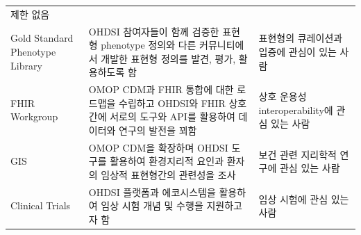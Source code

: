 \documentclass[10.5pt]{book}
\theoremstyle{definition}
\theoremstyle{definition}
\theoremstyle{definition}
\theoremstyle{remark}
\begin{document}
\begin{longtable}[]{@{}lll@{}}
\begin{minipage}[t]{0.37\columnwidth}
제한 없음\strut
\end{minipage}\tabularnewline
\begin{minipage}[t]{0.11\columnwidth}\raggedright\strut
Gold Standard Phenotype Library\strut
\end{minipage} & \begin{minipage}[t]{0.44\columnwidth}\raggedright\strut
OHDSI 참여자들이 함께 검증한 표현형 phenotype 정의와 다른 커뮤니티에서
개발한 표현형 정의를 발견, 평가, 활용하도록 함\strut
\end{minipage} & \begin{minipage}[t]{0.37\columnwidth}\raggedright\strut
표현형의 큐레이션과 입증에 관심이 있는 사람\strut
\end{minipage}\tabularnewline
\begin{minipage}[t]{0.11\columnwidth}\raggedright\strut
FHIR Workgroup\strut
\end{minipage} & \begin{minipage}[t]{0.44\columnwidth}\raggedright\strut
OMOP CDM과 FHIR 통합에 대한 로드맵을 수립하고 OHDSI와 FHIR 상호 간에
서로의 도구와 API를 활용하여 데이터와 연구의 발전을 꾀함\strut
\end{minipage} & \begin{minipage}[t]{0.37\columnwidth}\raggedright\strut
상호 운용성 interoperability에 관심 있는 사람\strut
\end{minipage}\tabularnewline
\begin{minipage}[t]{0.11\columnwidth}\raggedright\strut
GIS\strut
\end{minipage} & \begin{minipage}[t]{0.44\columnwidth}\raggedright\strut
OMOP CDM을 확장하며 OHDSI 도구를 활용하여 환경지리적 요인과 환자의
임상적 표현형간의 관련성을 조사\strut
\end{minipage} & \begin{minipage}[t]{0.37\columnwidth}\raggedright\strut
보건 관련 지리학적 연구에 관심 있는 사람\strut
\end{minipage}\tabularnewline
\begin{minipage}[t]{0.11\columnwidth}\raggedright\strut
Clinical Trials\strut
\end{minipage} & \begin{minipage}[t]{0.44\columnwidth}\raggedright\strut
OHDSI 플랫폼과 에코시스템을 활용하여 임상 시험 개념 및 수행을 지원하고자
함\strut
\end{minipage} & \begin{minipage}[t]{0.37\columnwidth}\raggedright\strut
임상 시험에 관심 있는 사람\strut

\end{minipage}
\end{longtable}
\end{document}
